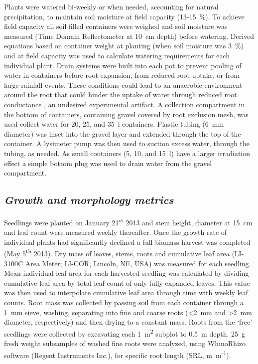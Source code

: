 \documentclass[a4paper]{article}\usepackage[]{graphicx}\usepackage[]{color}
\begin{document}
Plants were watered bi-weekly or when needed, accounting for natural precipitation, to maintain soil moisture at field capacity (13-15~\%). To achieve field capacity all soil filled containers were weighed and soil moisture was measured (Time Domain Reflectometer at 10~cm depth) before watering. Derived equations based on container weight at planting (when soil moisture was 3~\%) and at field capacity was used to calculate watering requirements for each individual plant. Drain systems were built into each pot to prevent pooling of water in containers before root expansion, from reduced root uptake, or from large rainfall events. These conditions could lead to an anaerobic environment around the root that could hinder the uptake of water through reduced root conductance \cite{poorter2009causes}, an undesired experimental artifact. A collection compartment in the bottom of containers, containing gravel covered by root exclusion mesh, was used collect water for 20, 25, and 35~l containers. Plastic tubing (6~mm diameter) was inset into the gravel layer and extended through the top of the container. A lysimeter pump was then used to suction excess water, through the tubing, as needed. As small containers (5, 10, and 15~l) have a larger irradiation effect a simple bottom plug was used to drain water from the gravel compartment.  

\subsection*{\textit{Growth and morphology metrics}}
Seedlings were planted on January 21\textsuperscript{st} 2013 and stem height, diameter at 15~cm and leaf count were measured weekly thereafter. Once the growth rate of individual plants had significantly declined a full biomass harvest was completed (May 5\textsuperscript{th} 2013). Dry mass of leaves, stems, roots and cumulative leaf area (LI-3100C Area Meter; LI-COR, Lincoln, NE, USA) was measured for each seedling. Mean individual leaf area for each harvested seedling was calculated by dividing cumulative leaf area by total leaf count of only fully expanded leaves. This value was then used to interpolate cumulative leaf area through time with weekly leaf counts. Root mass was collected by passing soil from each container through a 1~mm sieve, washing, separating into fine and coarse roots (\textless2~mm and \textgreater2~mm diameter, respectively) and then drying to a constant mass. Roots from the ‘free’ seedlings were collected by excavating each 1~m\textsuperscript{2} subplot to 0.5~m depth.  25~g fresh weight subsamples of washed fine roots were analyzed, using WhinoRhizo software (Regent Instruments Inc.), for specific root length (SRL, m~m\textsuperscript{-1}).
\end{document}
